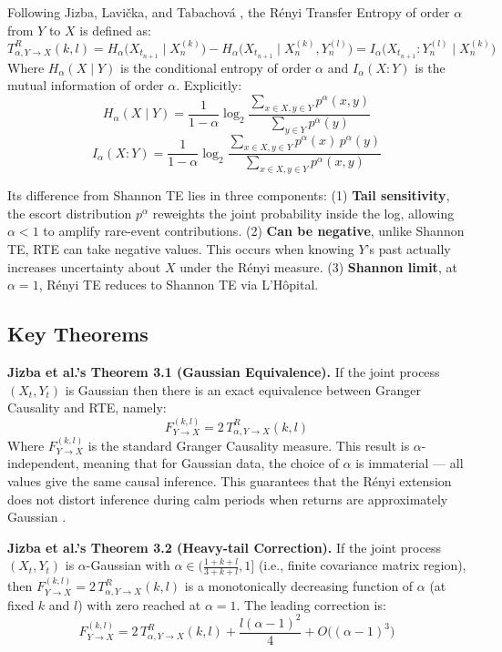 \documentclass[12pt,oneside]{report}
\begin{document}
Following Jizba, Lavička, and Tabachová \cite{jizba2022}, the Rényi
Transfer Entropy of order $\alpha$ from $Y$ to $X$ is defined as:
\[
  T_{\alpha, Y \rightarrow X}^{R}(k,l)
    = H_{\alpha}\bigl(X_{t_{n+1}} \mid X_{n}^{(k)}\bigr)
    - H_{\alpha}\bigl(X_{t_{n+1}} \mid X_{n}^{(k)}, Y_{n}^{(l)}\bigr)
    = I_{\alpha}\bigl(X_{t_{n+1}} : Y_{n}^{(l)} \mid X_{n}^{(k)}\bigr)
\]
Where $H_{\alpha}(X \mid Y)$ is the conditional entropy of order $\alpha$
and $I_{\alpha}(X:Y)$ is the mutual information of order $\alpha$.
Explicitly:
\[
  H_{\alpha}(X \mid Y)
    = \frac{1}{1-\alpha}\log_{2}
      \frac{\sum_{x \in X, y \in Y} p^{\alpha}(x,y)}{\sum_{y \in Y} p^{\alpha}(y)}
\]
\[
  I_{\alpha}(X:Y)
    = \frac{1}{1-\alpha}\log_{2}
      \frac{\sum_{x \in X, y \in Y} p^{\alpha}(x)\,p^{\alpha}(y)}
           {\sum_{x \in X, y \in Y} p^{\alpha}(x,y)}
\]

Its difference from Shannon TE lies in three components: (1)
\textbf{Tail sensitivity}, the escort distribution $p^{\alpha}$
reweights the joint probability inside the log, allowing $\alpha < 1$ to
amplify rare-event contributions. (2) \textbf{Can be negative}, unlike
Shannon TE, RTE can take negative values. This occurs when knowing $Y$'s
past actually increases uncertainty about $X$ under the Rényi measure.
(3) \textbf{Shannon limit}, at $\alpha = 1$, Rényi TE reduces to Shannon
TE via L'Hôpital.

\subsection{Key Theorems}\label{sec:theorems}

\textbf{Jizba et al.'s Theorem 3.1 (Gaussian Equivalence).} If the joint
process $(X_{t}, Y_{t})$ is Gaussian then there is an exact equivalence
between Granger Causality and RTE, namely:
\[
  F_{Y \rightarrow X}^{(k,l)} = 2\,T_{\alpha, Y \rightarrow X}^{R}(k,l)
\]
Where $F_{Y \rightarrow X}^{(k,l)}$ is the standard Granger Causality
measure. This result is $\alpha$-independent, meaning that for Gaussian
data, the choice of $\alpha$ is immaterial --- all values give the same
causal inference. This guarantees that the Rényi extension does not
distort inference during calm periods when returns are approximately
Gaussian \cite{jizba2022}.

\textbf{Jizba et al.'s Theorem 3.2 (Heavy-tail Correction).} If the
joint process $(X_{t}, Y_{t})$ is $\alpha$-Gaussian with
$\alpha \in \bigl(\frac{1+k+l}{3+k+l}, 1\bigr]$ (i.e., finite covariance
matrix region), then
$F_{Y \rightarrow X}^{(k,l)} = 2\,T_{\alpha, Y \rightarrow X}^{R}(k,l)$
is a monotonically decreasing function of $\alpha$ (at fixed $k$ and
$l$) with zero reached at $\alpha = 1$. The leading correction is:
\[
  F_{Y \rightarrow X}^{(k,l)}
    = 2\,T_{\alpha, Y \rightarrow X}^{R}(k,l)
    + \frac{l(\alpha - 1)^{2}}{4}
    + O\bigl((\alpha - 1)^{3}\bigr)
\]
\end{document}
